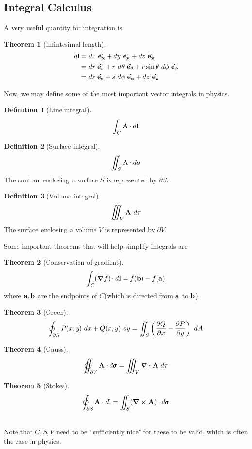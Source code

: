\documentclass[10pt, a4paper]{extarticle}
\theoremstyle{definition}
\newtheorem{thm}{Theorem}
\newtheorem{defn}{Definition}
\begin{document}
\subsection{Integral Calculus}
A very useful quantity for integration is
\begin{framed}
	\begin{thm}[Infintesimal length]
	\begin{align*}
		d\vb{l}&=dx\ \vu{e_x}+dy\ \vu{e_y}+dz\ \vu{e_z}\\
			   &=dr\ \vu{e_r}+r\ d\theta\ \vu{e_\theta}+r\sin\theta\ d\phi\ \vu{e_\phi}\\
			   &=ds\ \vu{e_s}+s\ d\phi\ \vu{e_\phi}+dz\ \vu{e_z}
	\end{align*}
\end{thm}
\end{framed}
Now, we may define some of the most important vector integrals in physics.
\begin{framed}
\begin{defn}[Line integral]
	\[\int_C \vb{A}\cdot d\vb{l}\]
\end{defn}

\begin{defn}[Surface integral]
	\[\iint_S \vb{A}\cdot d\pmb{\sigma}\]
	The contour enclosing a surface $S$ is represented by $\partial S$.
\end{defn}

\begin{defn}[Volume integral]
	\[\iiint_V \vb{A}\ d\tau\]
	The surface enclosing a volume $V$ is represented by $\partial V$.
\end{defn}
\end{framed}

Some important theorems that will help simplify integrals are
\begin{framed}
	\begin{thm}[Conservation of gradient]
		\[\int_C(\grad f)\cdot d\vb{l}=f(\vb{b})-f(\vb{a})\]
		where $\vb{a}, \vb{b}$ are the endpoints of $C$(which is directed from $\vb{a}$ to $\vb{b}$).
	\end{thm}
	\begin{thm}[Green]
		\[\oint_{\partial S}P(x,y)\ dx+Q(x,y)\ dy=\iint_S\left(\pdv{Q}{x}-\pdv{P}{y}\right)\ dA\]
	\end{thm}
	\begin{thm}[Gauss]
		\[\varoiint_{\partial V} \vb{A}\cdot d\pmb{\sigma}=\iiint_V \div \vb{A}\ d\tau\]
	\end{thm}

	\begin{thm}[Stokes]
		\[\oint_{\partial S} \vb{A}\cdot d\vb{l}=\iint_S (\curl\vb{A})\cdot d\pmb{\sigma}\]
	\end{thm}
	\hfill\\
	Note that $C,S,V$ need to be ``sufficiently nice" for these to be valid, which is often the case in physics.
\end{framed}
\end{document}
